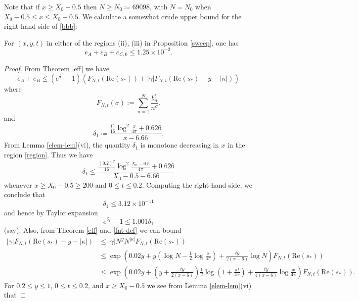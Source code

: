 Note that if $x \geq X_0 - 0.5$ then $N \geq N_0 \coloneqq 69098$, with $N=N_0$ when $X_0-0.5 \leq x \leq X_0+0.5$.  We calculate a somewhat crude upper bound for the right-hand side of \eqref{bbb}:

\begin{lemma}\label{lac} For $(x,y,t)$ in either of the regions (ii), (iii) in Proposition \ref{sweep}, one has
$$ e_A + e_B + e_{C,0} \leq 1.25 \times 10^{-3}.$$
\end{lemma}

\begin{proof}
From Theorem \ref{eff} we have
\begin{equation}\label{eaeb-bound}
 e_A + e_B \leq (e^{\delta_1}-1) (F_{N,t}(\mathrm{Re}(s_*)) + |\gamma| F_{N,t}( \mathrm{Re}(s_*) - y - |\kappa| ) )
\end{equation}
where
\begin{equation}\label{fnt-def}
 F_{N,t}( \sigma ) := \sum_{n=1}^N \frac{b_n^t}{n^\sigma}.
\end{equation}
and
\begin{equation}\label{dela}
 \delta_1 \coloneqq \frac{\frac{t^2}{16} \log^2 \frac{x}{4\pi} + 0.626}{x-6.66}.
\end{equation}
From Lemma \ref{elem-lem}(vi), the quantity $\delta_1$ is monotone decreasing in $x$ in the region \eqref{region}.  Thus we have
\begin{equation}\label{delta1-bound}
 \delta_1 \leq \frac{\frac{(0.2)^2}{16} \log^2 \frac{X_0-0.5}{4\pi} + 0.626}{X_0-0.5-6.66}
\end{equation}
whenever $x \geq X_0-0.5 \geq 200$ and $0 \leq t \leq 0.2$.  Computing the right-hand side, we conclude that
$$  \delta_1 \leq 3.12 \times 10^{-11}$$
and hence by Taylor expansion
$$ e^{\delta_1} - 1 \leq 1.001 \delta_1$$
(say).
Also, from Theorem \ref{eff} and \eqref{fnt-def} we can bound
\begin{align*}
|\gamma| F_{N,t}( \mathrm{Re}(s_*) - y - |\kappa| ) &\leq |\gamma| N^y N^{|\kappa|} F_{N,t}( \mathrm{Re}(s_*) ) \\
&\leq \exp\left( 0.02 y + y (\log N - \frac{1}{2} \log \frac{x}{4\pi}) + \frac{ty}{2(x-6)} \log N \right) F_{N,t}( \mathrm{Re}(s_*) )  \\
&\leq \exp\left( 0.02 y + (y + \frac{ty}{2(x-6)}) \frac{1}{2} \log(1 + \frac{\pi t}{4x}) + \frac{ty}{4(x-6)} \log \frac{x}{4\pi} \right) F_{N,t}( \mathrm{Re}(s_*) ).
\end{align*}
For $0.2 \leq y \leq 1$, $0 \leq t \leq 0.2$, and $x \geq X_0 - 0.5$ we see from Lemma \ref{elem-lem}(vi) that

\end{proof}
